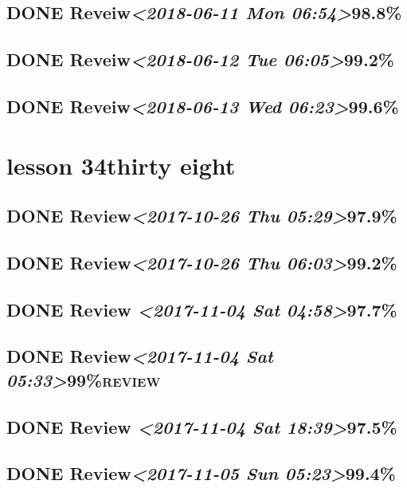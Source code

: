 \documentclass[11pt]{ctexart}
\begin{document}
\subsection{{\bfseries\sffamily DONE} Reveiw\textit{<2018-06-11 Mon 06:54>}98.8\%}
\label{sec:org0da4557}
\subsection{{\bfseries\sffamily DONE} Reveiw\textit{<2018-06-12 Tue 06:05>}99.2\%}
\label{sec:org2006254}
\subsection{{\bfseries\sffamily DONE} Reveiw\textit{<2018-06-13 Wed 06:23>}99.6\%}
\label{sec:org4f0e124}
\section{lesson 34thirty eight}
\label{sec:orgd9a2d0e}
\subsection{{\bfseries\sffamily DONE} Review\textit{<2017-10-26 Thu 05:29>}97.9\%}
\label{sec:org1d72875}
\subsection{{\bfseries\sffamily DONE} Review\textit{<2017-10-26 Thu 06:03>}99.2\%}
\label{sec:orgb3d80f1}
\subsection{{\bfseries\sffamily DONE} Review \textit{<2017-11-04 Sat 04:58>}97.7\%}
\label{sec:org208c105}
\subsection{{\bfseries\sffamily DONE} Review\textit{<2017-11-04 Sat 05:33>}99\%\hfill{}\textsc{review}}
\label{sec:orgff2b43a}
\subsection{{\bfseries\sffamily DONE} Review \textit{<2017-11-04 Sat 18:39>}97.5\%}
\label{sec:org403da3f}
\subsection{{\bfseries\sffamily DONE} Review\textit{<2017-11-05 Sun 05:23>}99.4\%}
\label{sec:org11f6ad5}
\end{document}
